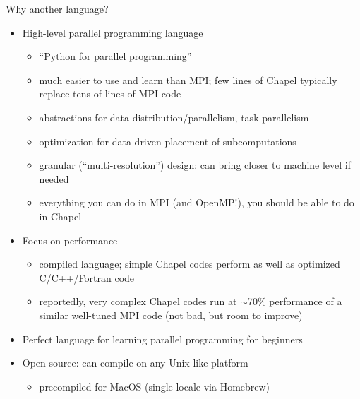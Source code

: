\documentclass[10pt,xcolor=pdftex,dvipsnames,table]{beamer}
\begin{document}
\begin{frame}{Why another language? }
  {\let\normalsize\small \normalsize
    \begin{itemize}\setlength{\itemsep}{2mm}
    \item High-level parallel programming language
      \smallskip
          {\let\small\scriptsize \small
            \begin{itemize}\setlength{\itemsep}{0.5mm}
            \item ``Python for parallel programming''
            \item much easier to use and learn than MPI; few lines of Chapel typically replace tens of lines
              of MPI code
            \item abstractions for data distribution/parallelism, task parallelism
            \item optimization for data-driven placement of subcomputations
            \item granular (``multi-resolution'') design: can bring closer to machine level if needed
            \item everything you can do in MPI (and OpenMP!), you should be able to do in Chapel
          \end{itemize}}
        \item Focus on performance
          \smallskip
              {\let\small\scriptsize \small
                \begin{itemize}\setlength{\itemsep}{1mm}
                \item compiled language; simple Chapel codes perform as well as optimized C/C++/Fortran code
                \item reportedly, very complex Chapel codes run at $\sim$70\% performance of a similar well-tuned
                  MPI code (not bad, but room to improve)
              \end{itemize}}
            \item Perfect language for learning parallel programming for beginners
            \item Open-source: can compile on any Unix-like platform
              {\let\small\scriptsize \small
                \begin{itemize}\setlength{\itemsep}{1mm}
                \item precompiled for MacOS (single-locale via Homebrew)

\end{itemize}}
\end{itemize}}
\end{frame}
\end{document}

